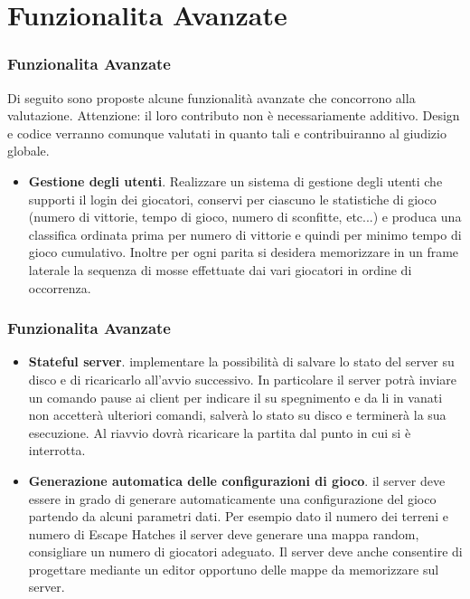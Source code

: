 \documentclass{beamer}
\begin{document}
\section{Funzionalita Avanzate}
\begin{frame}
\frametitle{Funzionalita Avanzate}

Di seguito sono proposte alcune funzionalit\`a avanzate che concorrono alla valutazione.  Attenzione: il loro contributo non \`e  necessariamente additivo. Design e codice verranno comunque valutati in quanto tali e contribuiranno al giudizio globale.

\begin{itemize}
\item \textbf{Gestione degli utenti}. Realizzare un sistema di
  gestione degli utenti che supporti il login dei giocatori, conservi
  per ciascuno le statistiche di gioco (numero di vittorie, tempo di
  gioco, numero di sconfitte, etc...) e produca una classifica
  ordinata prima per numero di vittorie e quindi per minimo tempo di
  gioco cumulativo. Inoltre per ogni parita si desidera
  memorizzare in un frame laterale la sequenza di mosse effettuate dai
  vari giocatori in ordine di occorrenza.
\end{itemize}
\end{frame}

\begin{frame}
\frametitle{Funzionalita Avanzate}
\begin{itemize}
\item  \textbf{Stateful server}. implementare la possibilit\`a di salvare lo stato del server su disco e di ricaricarlo all'avvio successivo. In particolare il server potr\`a inviare un comando pause ai client per indicare il su spegnimento e da li in vanati non accetter\`a ulteriori comandi, salver\`a lo stato su disco e terminer\`a la sua esecuzione. Al riavvio dovr\`a ricaricare la partita dal punto in cui si \`e interrotta. 
\item \textbf{Generazione automatica delle configurazioni di
    gioco}. il server deve essere in grado di generare automaticamente
  una configurazione del gioco partendo da alcuni parametri dati. Per
  esempio dato il numero dei terreni e numero di Escape Hatches il
  server deve generare una mappa random, consigliare un numero di
  giocatori adeguato. Il server deve anche consentire di progettare
  mediante un editor opportuno delle mappe da memorizzare sul server.
\end{itemize}

\end{frame}
\end{document}
